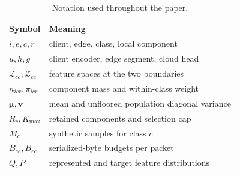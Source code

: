 \begin{table}[t]
\caption{Notation used throughout the paper.}\label{tab:notation}
\centering\small
\begin{tabularx}{\columnwidth}{@{}lX@{}}
\toprule Symbol & Meaning\\\midrule
$i,e,c,r$ & client, edge, class, local component\\
$u,h,g$ & client encoder, edge segment, cloud head\\
$\mathcal Z_{ce},\mathcal Z_{ec}$ & feature spaces at the two boundaries\\
$n_{icr},\pi_{icr}$ & component mass and within-class weight\\
$\bm\mu,\bm v$ & mean and unfloored population diagonal variance\\
$R_c,K_{\max}$ & retained components and selection cap\\
$M_c$ & synthetic samples for class $c$\\
$B_{ce},B_{ec}$ & serialized-byte budgets per packet\\
$Q,P$ & represented and target feature distributions\\
\bottomrule
\end{tabularx}
\end{table}
